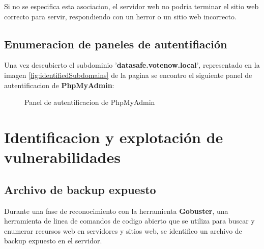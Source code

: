 \documentclass[a4paper]{article} %
\begin{document}
  Si no se especifica esta asociacion, el servidor web no podria terminar el sitio web correcto para servir, respondiendo con un herror o un sitio web incorrecto.

  \clearpage
  \subsection{Enumeracion de paneles de autentifiación}

  Una vez descubierto el subdominio '\textbf{datasafe.votenow.local}', representado en la imagen \ref{fig:identifiedSubdomains} de la pagina \pageref{fig:identifiedSubdomains} se encontro el siguiente panel de autentificacion de \textbf{PhpMyAdmin}:

  \vspace{0.2cm}

  \begin{figure}[h]

    \centering
    \setlength{\fboxrule}{0.8pt}
      \caption{Panel de autentificacion de PhpMyAdmin}
      \label{fig:phpmyadmin}
  \end{figure}

  \section{Identificacion y explotación de vulnerabilidades}
  \subsection{Archivo de backup expuesto}

  Durante una fase de reconocimiento con la herramienta \textbf{Gobuster}, una herramienta de linea de comandos de codigo abierto que se utiliza para buscar y enumerar recursos web en servidores y sitios web, se identifico un archivo de backup expuesto en el servidor.
\end{document}

